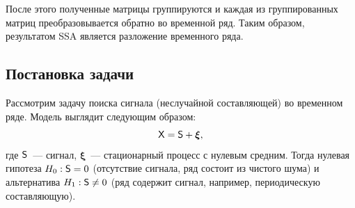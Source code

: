 \documentclass[specialist,
substylefile = spbu_report.rtx,
subf,href,colorlinks=true, 12pt]{disser}
\theoremstyle{definition}
\newtheorem{definition}{Определение}[section]
\newcommand{\R}{\mathbb{R}}
\begin{document}
После этого полученные матрицы группируются и каждая из группированных матриц преобразовывается обратно во временной ряд. Таким образом, результатом SSA является разложение временного ряда.
\subsection{Постановка задачи}
Рассмотрим задачу поиска сигнала (неслучайной составляющей) во временном ряде. Модель выглядит следующим образом:
\[
	\mathsf{X}=\mathsf{S} + \bm\xi,
\]
где $\mathsf{S}$~--- сигнал, $\bm\xi$~--- стационарный процесс с нулевым средним. Тогда нулевая гипотеза $H_0:\mathsf{S}=0$ (отсутствие сигнала, ряд состоит из чистого шума) и альтернатива $H_1:\mathsf{S}\ne0$ (ряд содержит сигнал, например, периодическую составляющую).

\end{document}

